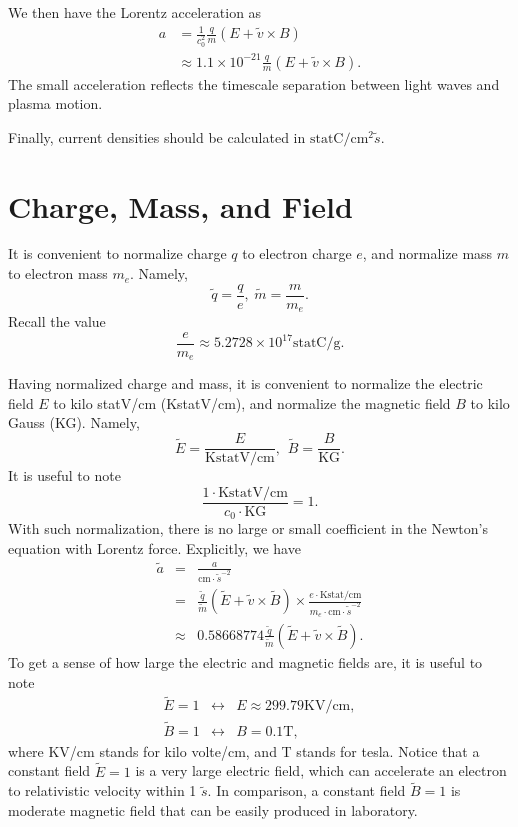\documentclass[paper=a4, fontsize=11pt]{scrartcl} %
\numberwithin{equation}{section} %
\numberwithin{figure}{section} %
\numberwithin{table}{section} %
\begin{document}
We then have the Lorentz acceleration as
\begin{align}
	a &= \frac{1}{c_0^2} \frac{q}{m} \left( E + \tilde{v} \times B \right)\\
	&\approx 1.1\times 10^{-21} \frac{q}{m} \left( E + \tilde{v} \times B \right).
\end{align}
The small acceleration reflects the timescale separation between light waves and plasma motion.

Finally, current densities should be calculated in $\text{statC} / \text{cm}^2 \tilde{s}$.

\section*{Charge, Mass, and Field}
It is convenient to normalize charge $q$ to electron charge $e$, and normalize mass $m$ to electron mass $m_e$. Namely,
\begin{equation}
	\tilde{q}=\frac{q}{e},\hspace{3pt} \tilde{m}=\frac{m}{m_e}.
\end{equation}
Recall the value
\begin{equation}
	\frac{e}{m_e}\approx 5.2728\times10^{17} \text{statC}/\text{g}.
\end{equation}

Having normalized charge and mass, it is convenient to normalize the electric field $E$ to kilo statV/cm (KstatV/cm), and normalize the magnetic field $B$ to kilo Gauss (KG). Namely,
\begin{equation}
	\tilde{E}=\frac{E}{\text{KstatV/cm}},\hspace{5pt} \tilde{B}=\frac{B}{\text{KG}}.
\end{equation}
It is useful to note
\begin{equation}
	\frac{1\cdot\text{KstatV/cm}}{c_0\cdot\text{KG}}=1.
\end{equation}
With such normalization, there is no large or small coefficient in the Newton's equation with Lorentz force. Explicitly, we have
\begin{eqnarray}
	\tilde{a}&=&\frac{a}{\text{cm}\cdot\tilde{s}^{-2}} \\
                 &=& \frac{\tilde{q}}{\tilde{m}}(\tilde{E}+\tilde{v}\times\tilde{B})
			\times\frac{e\cdot\text{Kstat/cm}}{m_e\cdot\text{cm}\cdot\tilde{s}^{-2}} \\
                 &\approx& 0.58668774 \frac{\tilde{q}}{\tilde{m}}(\tilde{E}+\tilde{v}\times\tilde{B}).
\end{eqnarray}
To get a sense of how large the electric and magnetic fields are, it is useful to note
\begin{eqnarray}
	\tilde{E}=1&\leftrightarrow& E\approx 299.79\text{KV/cm},\\
	\tilde{B}=1&\leftrightarrow& B=0.1\text{T},
\end{eqnarray}
where KV/cm stands for kilo volte/cm, and T stands for tesla. Notice that a constant field $\tilde{E}=1$ is a very large electric field, which can accelerate an electron to relativistic velocity within 1 $\tilde{s}$. In comparison, a constant field $\tilde{B}=1$ is moderate magnetic field that can be easily produced in laboratory.

\end{document}

